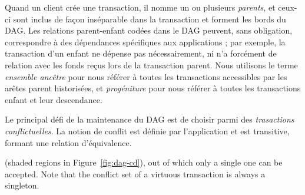 Quand un client crée une transaction, il nomme un ou plusieurs \emph{parents}, et ceux-ci sont inclus de façon inséparable dans la transaction et forment les bords du DAG\@.
Les relations parent-enfant codées dans le DAG peuvent, sans obligation, correspondre à des dépendances spécifiques aux applications ; par exemple, la transaction d'un enfant ne dépense pas nécessairement, ni n'a forcément de relation avec les fonds reçus lors de la transaction parent.
Nous utilisons le terme \emph{ensemble ancêtre} pour nous référer à toutes les transactions accessibles par les arêtes parent historisées, et \emph{progéniture} pour nous référer à toutes les transactions enfant et leur descendance.

Le principal défi de la maintenance du DAG est de choisir parmi des \emph{trasactions conflictuelles}.
La notion de conflit est définie par l'application et est transitive, formant une relation d'équivalence.

(shaded regions in Figure~\ref{fig:dag-cd}), out of which only a single one can be accepted.
Note that the conflict set of a virtuous transaction is always a singleton.
 
